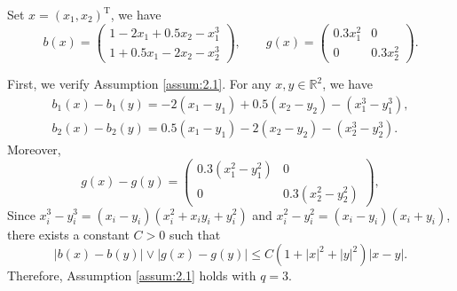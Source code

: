\documentclass{article}
\begin{document}
Set $x=(x_1,x_2)^{\mathrm{T}}$, we have 
\begin{equation*}
b(x) =
\begin{pmatrix}
	1 - 2x_1 + 0.5x_2 - x_1^3 \\
	1 + 0.5x_1 - 2x_2 - x_2^3
\end{pmatrix},
\qquad
g(x) =
\begin{pmatrix}
	0.3x_1^2 & 0 \\
	0 & 0.3x_2^2
\end{pmatrix}.
\end{equation*}

First, we verify Assumption \ref{assum:2.1}. For any $x,y\in\mathbb{R}^2$, we have
\begin{align*}
b_1(x)-b_1(y)=-2(x_1-y_1)+0.5(x_2-y_2)-(x_1^3-y_1^3),\\
b_2(x)-b_2(y)=0.5(x_1-y_1)-2(x_2-y_2)-(x_2^3-y_2^3).
\end{align*}
Moreover,
\begin{equation*}
g(x)-g(y) =
\begin{pmatrix}
	0.3(x_1^2-y_1^2) & 0 \\
	0 & 0.3(x_2^2-y_2^2)
\end{pmatrix},
\end{equation*}
Since $x_i^3-y_i^3=(x_i-y_i)(x_i^2+x_iy_i+y_i^2)$ and $x_i^2-y_i^2=(x_i-y_i)(x_i+y_i)$, there exists a constant $C>0$ such that
\begin{equation*}
|b(x)-b(y)|\vee |g(x)-g(y)|\leq C(1+|x|^2+|y|^2)|x-y|.
\end{equation*}
Therefore, Assumption \ref{assum:2.1} holds with $q=3$.
\end{document}
